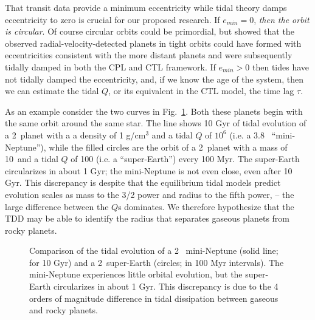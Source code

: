 \medskip
{\centerline{}}
\smallskip

That transit data provide a minimum eccentricity while tidal theory
damps eccentricity to zero is crucial for our proposed research. If
$e_{min} = 0$, \textit{then the orbit is circular}. Of course circular
orbits could be primordial, but \cite{Jackson08a,Matsumura10} showed
that the observed radial-velocity-detected planets in tight orbits
could have formed with eccentricities consistent with the more distant
planets and were subsequently tidally damped in both the CPL and CTL
framework. If $e_{min} > 0$ then tides have not tidally damped the
eccentricity, and, if we know the age of the system, then we can
estimate the tidal $Q$, or its equivalent in the CTL model, the time
lag $\tau$.

As an example consider the two curves in Fig.~\ref{fig:compareQ}. Both
these planets begin with the same orbit around the same star. The line
shows 10 Gyr of tidal evolution of a 2~\rearth planet with a a density
of 1 g/cm$^3$ and a tidal $Q$ of $10^6$ (i.e. a 3.8~\mearth
``mini-Neptune''), while the filled circles are the orbit of a
2~\rearth planet with a mass of 10~\mearth and a tidal $Q$ of 100
(i.e. a ``super-Earth'') every 100 Myr. The super-Earth circularizes
in about 1 Gyr; the mini-Neptune is not even close, even after 10
Gyr. This discrepancy is despite that the equilibrium tidal models
predict evolution scales as mass to the 3/2 power and radius to the
fifth power, -- the large difference between the $Q$s dominates. We
therefore hypothesize that the TDD may be able to identify the radius
that separates gaseous planets from rocky planets.

\begin{figure}[h]
\centering
\begin{minipage}{2.7in}
\end{minipage}
\begin{minipage}{2.7in}
\caption{\label{fig:compareQ}Comparison of the tidal evolution of a 2~\rearth
mini-Neptune (solid line; for 10 Gyr) and a 2~\rearth super-Earth (circles; in 100 Myr intervals). The mini-Neptune experiences little orbital evolution, but the super-Earth circularizes in about 1 Gyr. This discrepancy is due to the 4 orders of magnitude difference in tidal dissipation between gaseous and rocky planets.}
\end{minipage}
\end{figure}

